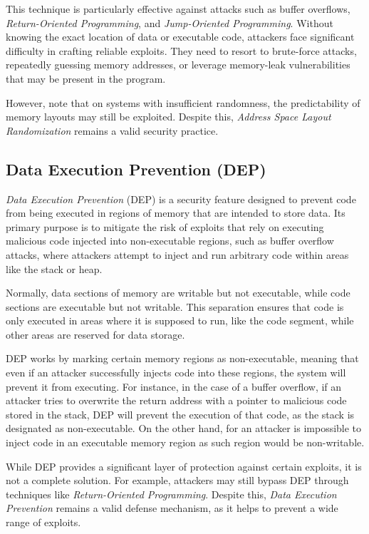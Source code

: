 This technique is particularly effective against attacks such as buffer
overflows, \textit{Return-Oriented Programming}, and \textit{Jump-Oriented
Programming}. Without knowing the exact location of data or executable code,
attackers face significant difficulty in crafting reliable exploits. They need to
resort to brute-force attacks, repeatedly guessing memory addresses, or leverage
memory-leak vulnerabilities that may be present in the program.

However, note that on systems with insufficient randomness, the predictability of
memory layouts may still be exploited. Despite this, \textit{Address Space
Layout Randomization} remains a valid security practice.

\subsection{Data Execution Prevention (DEP)}
\label{subsec:background_dep}

\textit{Data Execution Prevention} (DEP) is a security feature designed to
prevent code from being executed in regions of memory that are intended to store
data. Its primary purpose is to mitigate the risk of exploits that rely on executing
malicious code injected into non-executable regions, such as buffer overflow
attacks, where attackers attempt to inject and run arbitrary code within areas like
the stack or heap.

Normally, data sections of memory are writable but not executable, while code sections
are executable but not writable. This separation ensures that code is only
executed in areas where it is supposed to run, like the code segment, while
other areas are reserved for data storage.

DEP works by marking certain memory regions as non-executable, meaning that even
if an attacker successfully injects code into these regions, the system will
prevent it from executing. For instance, in the case of a buffer overflow, if an
attacker tries to overwrite the return address with a pointer to malicious code stored
in the stack, DEP will prevent the execution of that code, as the stack is designated
as non-executable. On the other hand, for an attacker is impossible to inject code
in an executable memory region as such region would be non-writable.

While DEP provides a significant layer of protection against certain exploits,
it is not a complete solution. For example, attackers may still bypass DEP
through techniques like \textit{Return-Oriented Programming}. Despite this, \textit{Data
Execution Prevention} remains a valid defense mechanism, as it helps to prevent a
wide range of exploits.

